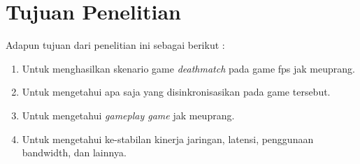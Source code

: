\section{Tujuan Penelitian}
\noindent

Adapun tujuan dari penelitian ini sebagai berikut :
\begin{enumerate}
	\item Untuk menghasilkan skenario game \textit{deathmatch} pada game fps jak meuprang.
	\item Untuk mengetahui apa saja yang disinkronisasikan pada game tersebut.
	\item Untuk mengetahui \textit{gameplay game} jak meuprang.
	\item Untuk mengetahui ke-stabilan kinerja jaringan, latensi, penggunaan bandwidth, dan lainnya. 
\end{enumerate}






